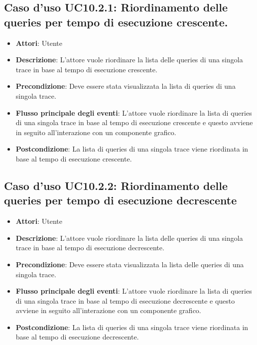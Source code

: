 \subsection{Caso d'uso UC10.2.1: Riordinamento delle queries per tempo di esecuzione crescente.}
\begin{itemize}
\item \textbf{Attori}: Utente
\item \textbf{Descrizione}: L'attore vuole riordinare la lista delle queries di una singola trace in base al tempo di esecuzione crescente.
\item \textbf{Precondizione}: Deve essere stata visualizzata la lista di queries di una singola trace.
\item \textbf{Flusso principale degli eventi}: L'attore vuole riordinare la lista di queries di una singola trace in base al tempo di esecuzione crescente e questo avviene in seguito all'interazione con un componente grafico.
\item \textbf{Postcondizione}: La lista di queries di una singola trace viene riordinata in base al tempo di esecuzione crescente.
\end{itemize}
\subsection{Caso d'uso UC10.2.2: Riordinamento delle queries per tempo di esecuzione decrescente}
\begin{itemize}
\item \textbf{Attori}: Utente
\item \textbf{Descrizione}: L'attore vuole riordinare la lista delle queries di una singola trace in base al tempo di esecuzione decrescente.
\item \textbf{Precondizione}: Deve essere stata visualizzata la lista delle queries di una singola trace.
\item \textbf{Flusso principale degli eventi}: L'attore vuole riordinare la lista di queries di una singola trace in base al tempo di esecuzione decrescente e questo avviene in seguito all'interazione con un componente grafico.
\item \textbf{Postcondizione}: La lista di queries di una singola trace viene riordinata in base al tempo di esecuzione decrescente.
\end{itemize}
